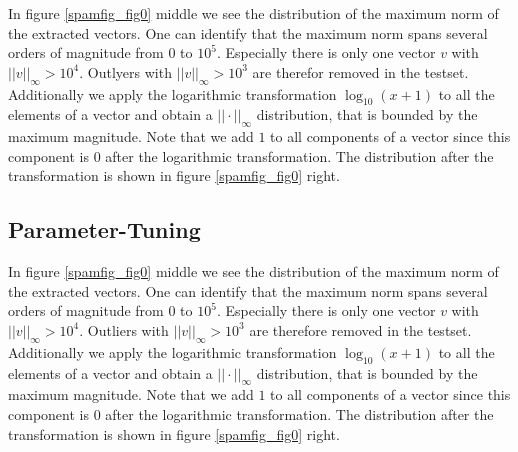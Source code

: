 \documentclass[11pt]{article}
\begin{document}
In figure \ref{spamfig_fig0} middle we see the distribution of the maximum norm of the extracted vectors. One can identify that the maximum norm spans several orders of magnitude from $0$ to $10^5$. Especially there is only one vector $v$ with $||v||_\infty>10^4$. Outlyers with $||v||_\infty>10^3$ are therefor removed in the testset. Additionally we apply the logarithmic transformation $\log_{10}(x+1)$ to all the elements of a vector and obtain a $||\cdot||_\infty$ distribution, that is bounded by the maximum magnitude. Note that we add $1$ to all components of a vector since this component is $0$ after the logarithmic transformation. The distribution after the transformation is shown in figure \ref{spamfig_fig0} right.




\subsection{Parameter-Tuning}
In figure \ref{spamfig_fig0} middle we see the distribution of the maximum norm of the extracted vectors. One can identify that the maximum norm spans several orders of magnitude from $0$ to $10^5$. Especially there is only one vector $v$ with $||v||_\infty>10^4$. Outliers with $||v||_\infty>10^3$ are therefore removed in the testset. Additionally we apply the logarithmic transformation $\log_{10}(x+1)$ to all the elements of a vector and obtain a $||\cdot||_\infty$ distribution, that is bounded by the maximum magnitude. Note that we add $1$ to all components of a vector since this component is $0$ after the logarithmic transformation. The distribution after the transformation is shown in figure \ref{spamfig_fig0} right.
%
\newline
\end{document}
